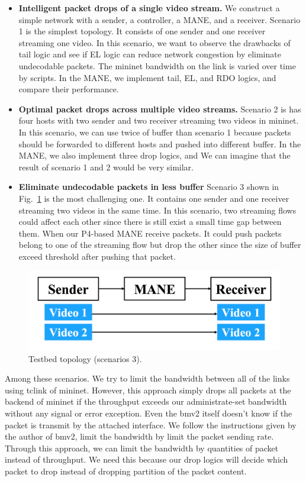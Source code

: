 \begin{itemize} 
	\item {\bf Intelligent packet drops of a single video stream.}
	We construct a simple network with a sender, a controller, a MANE, and a receiver. Scenario 1 is the simplest topology. It consists of one sender and one receiver streaming one video. In this scenario, we want to observe the drawbacks of tail logic and see if EL logic can reduce network congestion by eliminate undecodable packets. The mininet bandwidth on the link is varied over time by scripts. In the MANE, we implement tail, EL, and RDO logics, and compare their performance. 

	\item {\bf Optimal packet drops across multiple video streams.}
	Scenario 2 is has four hosts with two sender and two receiver streaming two videos in mininet. In this scenario, we can use twice of buffer than scenario 1 because packets should be forwarded to different hosts and pushed into different buffer. In the MANE, we also implement three drop logics, and We can imagine that the result of scenario 1 and 2 would be very similar.

	\item{\bf Eliminate undecodable packets in less buffer}
	Scenario 3 shown in Fig.~\ref{scenario3} is the most challenging one. It contains one sender and one receiver streaming two videos in the same time. In this scenario, two streaming flows could affect each other since there is still exist a small time gap between them. When our P4-based MANE receive packets. It could push packets belong to one of the streaming flow but drop the other since the size of buffer exceed threshold after pushing that packet. 

\end{itemize}

\begin{figure}[tbh]
	\centering
	\includegraphics[width=.50\textwidth]{fig/scenario3.png}
	\caption{Testbed topology (scenarios 3).}
	\label{scenario3} 
\end{figure}

Among these scenarios. We try to limit the bandwidth between all of the links using tclink of mininet. However, this approach simply drops all packets at the backend of mininet if the throughput exceeds our administrate-set bandwidth without any signal or error exception. Even the bmv2 itself doesn't know if the packet is transmit by the attached interface. We follow the instructions given by the author of bmv2, limit the bandwidth by limit the packet sending rate. Through this approach, we can limit the bandwidth by quantities of packet instead of throughput. We need this because our drop logics will decide which packet to drop instead of dropping partition of the packet content.

